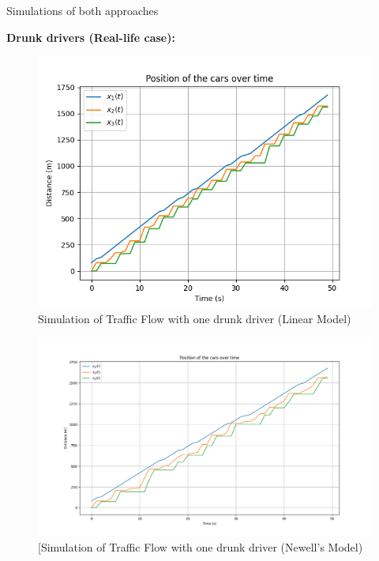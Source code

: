 \documentclass{beamer}
\begin{document}
\begin{frame}{Simulations of both approaches}
	\begin{center}
		\textbf{Drunk drivers (Real-life case):}
	\end{center}
	\begin{minipage}{0.40\textwidth}
		\centering
		\begin{figure}
			\includegraphics[width=\textwidth]{Model1W3C_O_Aco_D2.png}
			\caption{Simulation of Traffic Flow with one drunk driver (Linear Model)}
		\end{figure}
	\end{minipage}\hfill
	\begin{minipage}{0.51\textwidth}
		\centering
		\begin{figure}
			\includegraphics[width=\textwidth]{Model1W3C_O_Aco_I2.png}
			\caption{[Simulation of Traffic Flow with one drunk driver (Newell's Model)}
		\end{figure}
	\end{minipage}
\end{frame}
\end{document}
